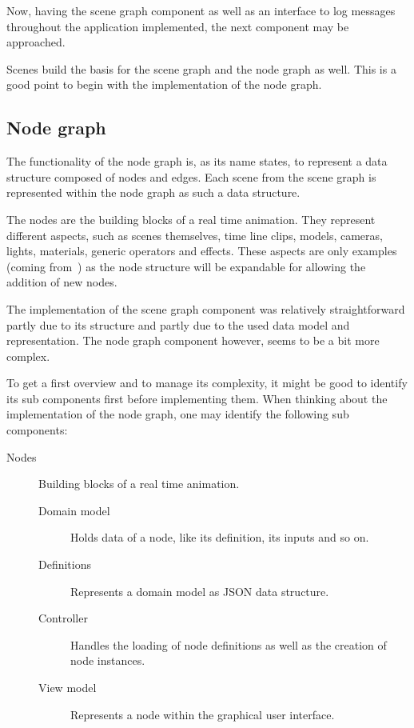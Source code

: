 \documentclass[
    a4paper,      %
    10pt,         %
    openright,    %
    notitlepage,  %
    parskip=half, %
]{scrreprt}       %
\theoremstyle{definition}                    %
\begin{document}
Now, having the scene graph component as well as an interface to log messages
throughout the application implemented, the next component may be approached.

Scenes build the basis for the scene graph and the node graph as well. This is a
good point to begin with the implementation of the node graph.

\subsection{Node graph}
\label{subsec:node-graph}

The functionality of the node graph is, as its name states, to represent a data
structure composed of nodes and edges. Each scene from the scene graph is
represented within the node graph as such a data structure.

The nodes are the building blocks of a real time animation. They represent
different aspects, such as scenes themselves, time line clips, models, cameras,
lights, materials, generic operators and effects. These aspects are only examples
(coming from~) as the node
structure will be expandable for allowing the addition of new nodes.

The implementation of the scene graph component was relatively straightforward
partly due to its structure and partly due to the used data model and
representation. The node graph component however, seems to be a bit more complex.

To get a first overview and to manage its complexity, it might be good to
identify its sub components first before implementing them.
When thinking about the implementation of the node graph, one may identify the
following sub components:

\begin{description}
\item[Nodes] Building blocks of a real time animation.
  \begin{description}
    \item[Domain model] Holds data of a node, like its definition, its inputs
                        and so on.
    \item[Definitions]  Represents a domain model as JSON data structure.
    \item[Controller]   Handles the loading of node definitions as well as the
                        creation of node instances.
    \item[View model]   Represents a node within the graphical user interface.
  \end{description}
\end{description}
\end{document}
